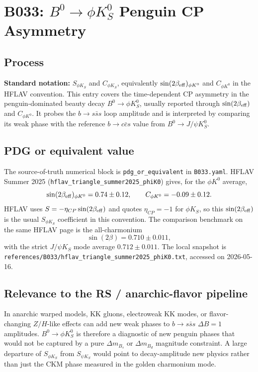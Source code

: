 
\section{B033: \(B^0\to\phi K_S^0\) Penguin CP Asymmetry}

\subsection*{Process}
\textbf{Standard notation:} \(S_{\phi K_S}\) and \(C_{\phi K_S}\), equivalently
\(\sin(2\beta_{\rm eff})_{\phi K^0}\) and \(C_{\phi K^0}\) in the HFLAV
convention.
This entry covers the time-dependent CP asymmetry in the penguin-dominated
beauty decay \(B^0\to\phi K_S^0\), usually reported through
\(\sin(2\beta_{\rm eff})\) and \(C_{\phi K^0}\).  It probes the
\(b\to s\bar s s\) loop amplitude and is interpreted by comparing its weak
phase with the reference \(b\to c\bar c s\) value from
\(B^0\to J/\psi K_S^0\).

\subsection*{PDG or equivalent value}
The source-of-truth numerical block is \texttt{pdg\_or\_equivalent} in
\texttt{B033.yaml}.  HFLAV Summer 2025
(\texttt{hflav\_triangle\_summer2025\_phiK0}) gives, for the \(\phi K^0\)
average,
\[
  \sin(2\beta_{\rm eff})_{\phi K^0}=0.74\pm0.12,\qquad
  C_{\phi K^0}=-0.09\pm0.12.
\]
HFLAV uses \(S=-\eta_{CP}\sin(2\beta_{\rm eff})\) and quotes
\(\eta_{CP}=-1\) for \(\phi K_S\), so this \(\sin(2\beta_{\rm eff})\) is the
usual \(S_{\phi K_S}\) coefficient in this convention.  The comparison
benchmark on the same HFLAV page is the all-charmonium
\[
  \sin(2\beta)=0.710\pm0.011,
\]
with the strict \(J/\psi K_S\) mode average \(0.712\pm0.011\).  The local
snapshot is \texttt{references/B033/hflav\_triangle\_summer2025\_phiK0.txt},
accessed on 2026-05-16.

\subsection*{Relevance to the RS / anarchic-flavor pipeline}
In anarchic warped models, KK gluons, electroweak KK modes, or flavor-changing
\(Z/H\)-like effects can add new weak phases to \(b\to s\bar s s\)
\(\Delta B=1\) amplitudes.  \(B^0\to\phi K_S^0\) is therefore a diagnostic of
new penguin phases that would not be captured by a pure \(\Delta m_{B_s}\) or
\(\Delta m_{B_d}\) magnitude constraint.  A large departure of
\(S_{\phi K_S}\) from \(S_{\psi K_S}\) would point to decay-amplitude new
physics rather than just the CKM phase measured in the golden charmonium mode.


